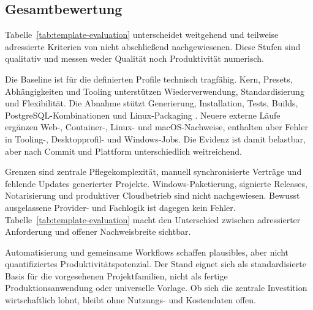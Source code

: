 \subsection{Gesamtbewertung}
\label{subsec:gesamtbewertung}

Tabelle~\ref{tab:template-evaluation} unterscheidet weitgehend und teilweise
adressierte Kriterien von nicht abschließend nachgewiesenen. Diese Stufen sind
qualitativ und messen weder Qualität noch Produktivität numerisch.



Die Baseline ist für die definierten Profile technisch tragfähig. Kern,
Presets, Abhängigkeiten und Tooling unterstützen Wiederverwendung,
Standardisierung und Flexibilität. Die Abnahme stützt Generierung,
Installation, Tests, Builds, PostgreSQL-Kombinationen und Linux-Packaging
\parencite{kleiveist2026acceptance}. Neuere externe Läufe ergänzen Web-,
Container-, Linux- und macOS-Nachweise, enthalten aber Fehler in Tooling-,
Desktopprofil- und Windows-Jobs.
Die Evidenz ist damit belastbar, aber nach Commit und Plattform unterschiedlich
weitreichend.

Grenzen sind zentrale Pflegekomplexität, manuell synchronisierte Verträge und
fehlende Updates generierter Projekte. Windows-Paketierung, signierte Releases,
Notarisierung und produktiver Cloudbetrieb sind nicht nachgewiesen. Bewusst
ausgelassene Provider- und Fachlogik ist dagegen kein Fehler.
Tabelle~\ref{tab:template-evaluation} macht den Unterschied zwischen
adressierter Anforderung und offener Nachweisbreite sichtbar.

Automatisierung und gemeinsame Workflows schaffen plausibles, aber nicht
quantifiziertes Produktivitätspotenzial. Der Stand eignet sich als
standardisierte Basis für die vorgesehenen Projektfamilien, nicht als fertige
Produktionsanwendung oder universelle Vorlage.
Ob sich die zentrale Investition wirtschaftlich lohnt, bleibt ohne Nutzungs-
und Kostendaten offen.
